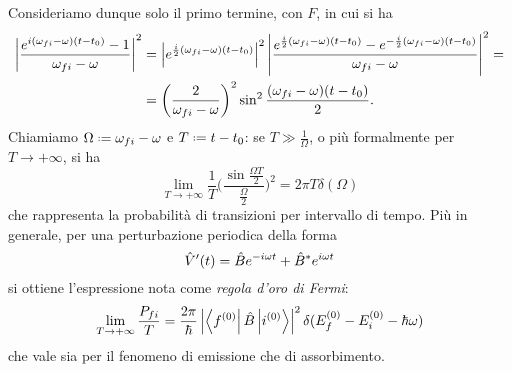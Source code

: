 Consideriamo dunque solo il primo termine, con $F$, in cui si ha
\begin{equation}
	\begin{split}
		\left|{\frac{e^{i(\omega_{fi}-\omega)(t-t_0)}-1}{\omega_{fi}-\omega}}\right|^2
		&=\left|{e^{\frac{i}2(\omega_{fi}-\omega)(t-t_0)}}\right|^2\left|{\frac{e^{\frac{i}2(\omega_{fi}-\omega)(t-t_0)}-e^{-\frac{i}2(\omega_{fi}-\omega)(t-t_0)}}{\omega_{fi}-\omega}}\right|^2=\\
		&=\bigg(\frac2{\omega_{fi}-\omega}\bigg)^2\sin^2\frac{(\omega_{fi}-\omega)(t-t_0)}2.
	\end{split}
\end{equation}
Chiamiamo $\Omega\defeq\omega_{fi}-\omega$ e $T\defeq t-t_0$: se $T\gg\frac1{\Omega}$, o più formalmente per $T\to+\infty$, si ha
\begin{equation}
	\lim_{T\to+\infty}\frac1{T}\bigg(\frac{\sin\frac{\Omega T}2}{\frac{\Omega}2}\bigg)^2=2\pi T\delta(\Omega)
\end{equation}
che rappresenta la probabilità di transizioni per intervallo di tempo.
Più in generale, per una perturbazione periodica della forma
\begin{equation}
	\hat{V}'(t)=\hat{B} e^{-i\omega t}+\hat{B}^* e^{i\omega t}
	\label{eq:perturbazione-periodica-generica}
\end{equation}
si ottiene l'espressione nota come \emph{regola d'oro di Fermi}:
\begin{equation}
	\lim_{T\to+\infty}\frac{P_{fi}}{T}=\frac{2\pi}{\hbar}\left|{\left\langle{f^{(0)}}\right|\hat{B}\left|{i^{(0)}}\right\rangle}\right|^2\delta(E_f^{(0)}-E_i^{(0)}-\hbar\omega)
	\label{eq:regola-oro-fermi}
\end{equation}
che vale sia per il fenomeno di emissione che di assorbimento.
